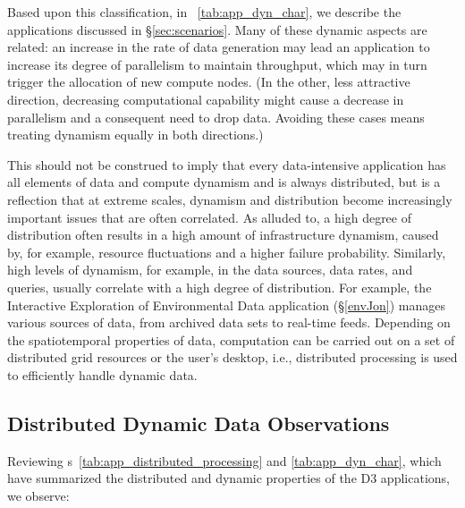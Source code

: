 Based upon this classification, in \tablename~\ref{tab:app_dyn_char}, we
describe the applications discussed in \S\ref{sec:scenarios}.  Many of
these dynamic aspects are related: an increase in the rate of data
generation may lead an application to increase its degree of
parallelism to maintain throughput, which may in turn trigger the
allocation of new compute nodes. (In the other, less attractive
direction, decreasing computational capability might cause a decrease
in parallelism and a consequent need to drop data. Avoiding these
cases means treating dynamism equally in both directions.)

This should not be construed to imply that every data-intensive
application has all elements of data and compute dynamism and is
always distributed, but is a reflection that at extreme scales,
dynamism and distribution become increasingly important issues that
are often correlated.  As alluded to, a high degree of distribution
often results in a high amount of infrastructure dynamism,
caused by, for example, resource fluctuations and a higher failure
probability.  Similarly, high levels of dynamism, for example, in the
data sources, data rates, and queries, usually correlate with a high
degree of distribution.  For example, the Interactive Exploration of
Environmental Data application (\S\ref{envJon}) manages various
sources of data, from archived data sets to real-time feeds.
Depending on the spatiotemporal properties of data, computation can be
carried out on a set of distributed grid resources or the user's
desktop, i.e., distributed processing is used to efficiently handle
dynamic data.

\subsection{Distributed Dynamic Data Observations}


Reviewing \tablename{s}~\ref{tab:app_distributed_processing} and \ref{tab:app_dyn_char},
which have summarized the distributed and dynamic properties of the D3
applications, we observe:


